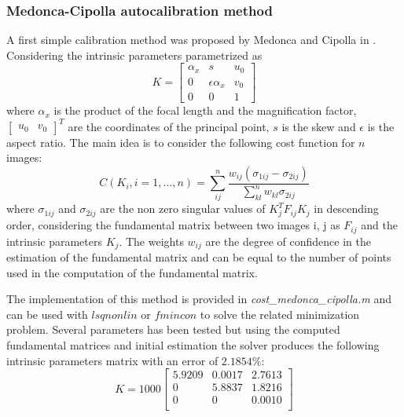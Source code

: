 \documentclass[11pt]{article}
\begin{document}
\subsubsection{Medonca-Cipolla autocalibration method}
A first simple calibration method was proposed by Medonca and Cipolla in \cite{Medonca99}. Considering the intrinsic parameters parametrized as
\begin{equation}
    K = \begin{bmatrix}
        \alpha_x & s & u_0 \\
        0   & \epsilon\alpha_x & v_0 \\
        0 & 0 & 1
    \end{bmatrix}
\end{equation}
where $\alpha_x$ is the product of the focal length and the magnification factor, $\begin{bmatrix}
    u_0 & v_0
\end{bmatrix}^T$ are the coordinates of the principal point, $s$ is the skew and $\epsilon$ is the aspect ratio. The main idea is to consider the following cost function for $n$ images:
\begin{equation}
    C(K_i, i = 1,\dots, n) = \sum_{ij}^{n} \frac{w_{ij} (\sigma_{1ij}-\sigma_{2ij})}{\sum_{kl}^{n}w_{kl} \sigma_{2ij}}
\end{equation}
where $\sigma_{1ij}$ and $\sigma_{2ij}$ are the non zero singular values of $K_j^TF_{ij}K_j$ in descending order, considering the fundamental matrix between two images i, j as $F_{ij}$ and the intrinsic parameters $K_j$. The weights $w_{ij}$ are the degree of confidence in the estimation of the fundamental matrix and can be equal to the number of points used in the computation of the fundamental matrix.

\bigskip
The implementation of this method is provided in \textit{cost\_medonca\_cipolla.m} and can be used with $lsqnonlin$ or $fmincon$ to solve the related minimization problem. Several parameters has been tested but using the computed fundamental matrices and initial estimation the solver produces the following intrinsic parameters matrix with an error of $2.1854\%$:
\begin{equation}
    K = 1000 \begin{bmatrix}
 
     5.9209  &  0.0017    &2.7613\\
          0  &  5.8837   & 1.8216\\
          0  &       0  &  0.0010\\ 
\end{bmatrix}
\end{equation}
\end{document}
